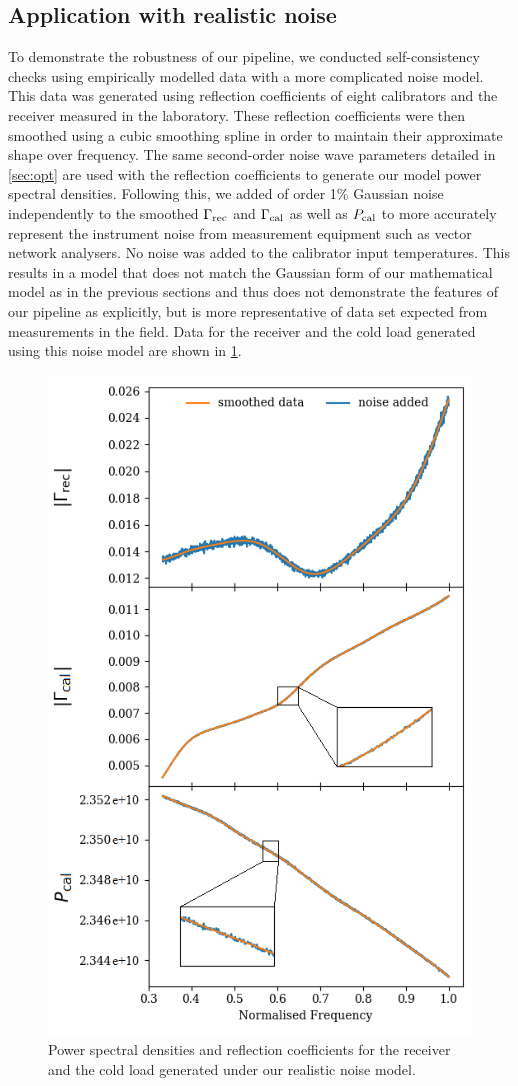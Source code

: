 \subsection{Application with realistic noise}\label{sec:sim_results}
To demonstrate the robustness of our pipeline, we conducted self-consistency checks using empirically modelled data with a more complicated noise model. This data was generated using reflection coefficients of eight calibrators and the receiver measured in the laboratory. These reflection coefficients were then smoothed using a cubic smoothing spline \citep{spline} in order to maintain their approximate shape over frequency. The same second-order noise wave parameters detailed in \cref{sec:opt} are used with the reflection coefficients to generate our model power spectral densities. Following this, we added of order 1\% Gaussian noise independently to the smoothed $\Gamma_{\mathrm{rec}}$ and $\Gamma_{\mathrm{cal}}$ as well as $P_{\mathrm{cal}}$ to more accurately represent the instrument noise from measurement equipment such as vector network analysers. No noise was added to the calibrator input temperatures. This results in a model that does not match the Gaussian form of our mathematical model as in the previous sections and thus does not demonstrate the features of our pipeline as explicitly, but is more representative of data set expected from measurements in the field. Data for the receiver and the cold load generated using this noise model are shown in \cref{fig:calQualities}.
\begin{figure}
    \centering
    \includegraphics[width=.5\textwidth]{calQualities}
    \caption{Power spectral densities and reflection coefficients for the receiver and the cold load generated under our realistic noise model. 
    \label{fig:calQualities}}
\end{figure}

